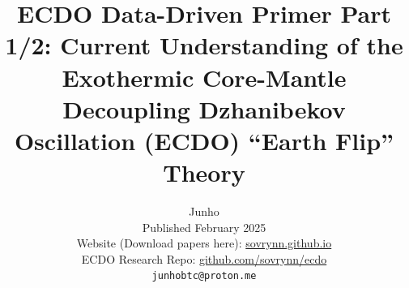 \documentclass[10pt,twocolumn,letterpaper]{article}
\begin{document}
\title{ECDO Data-Driven Primer Part 1/2: Current Understanding of the Exothermic Core-Mantle Decoupling Dzhanibekov Oscillation (ECDO) “Earth Flip” Theory}

\author{Junho\\
Published February 2025\\
Website (Download papers here): \href{https://sovrynn.github.io}{sovrynn.github.io}\\
ECDO Research Repo: \href{https://github.com/sovrynn/ecdo}{github.com/sovrynn/ecdo}\\
{\tt\small junhobtc@proton.me}
}

\maketitle
\end{document}
